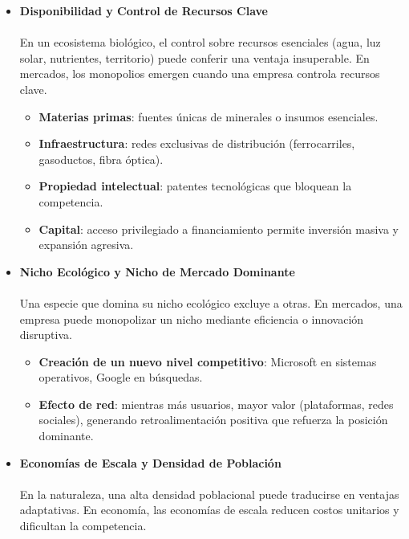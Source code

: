 \documentclass[a4paper,12pt]{article}
\begin{document}
\begin{itemize}
    \item \textbf{Disponibilidad y Control de Recursos Clave}

    \paragraph{}En un ecosistema biológico, el control sobre recursos esenciales (agua, luz solar, nutrientes, territorio) puede conferir una ventaja insuperable. En mercados, los monopolios emergen cuando una empresa controla recursos clave.

    \begin{itemize}
        \item \textbf{Materias primas}: fuentes únicas de minerales o insumos esenciales.
        \item \textbf{Infraestructura}: redes exclusivas de distribución (ferrocarriles, gasoductos, fibra óptica).
        \item \textbf{Propiedad intelectual}: patentes tecnológicas que bloquean la competencia.
        \item \textbf{Capital}: acceso privilegiado a financiamiento permite inversión masiva y expansión agresiva.
    \end{itemize}

    \item \textbf{Nicho Ecológico y Nicho de Mercado Dominante}

    \paragraph{}Una especie que domina su nicho ecológico excluye a otras. En mercados, una empresa puede monopolizar un nicho mediante eficiencia o innovación disruptiva.

    \begin{itemize}
        \item \textbf{Creación de un nuevo nivel competitivo}: Microsoft en sistemas operativos, Google en búsquedas.
        \item \textbf{Efecto de red}: mientras más usuarios, mayor valor (plataformas, redes sociales), generando retroalimentación positiva que refuerza la posición dominante.
    \end{itemize}

    \item \textbf{Economías de Escala y Densidad de Población}

    \paragraph{}En la naturaleza, una alta densidad poblacional puede traducirse en ventajas adaptativas. En economía, las economías de escala reducen costos unitarios y dificultan la competencia.


\end{itemize}
\end{document}
